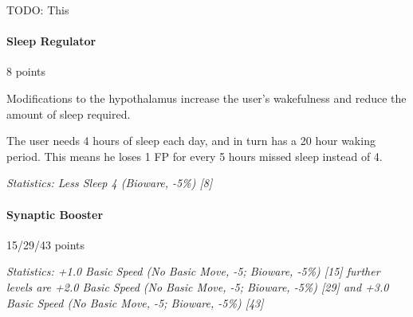 \begin{multicols*}{3}
	TODO: This
	
	\paragraph{Sleep Regulator}
	\begin{flushright}
		8 points
	\end{flushright}
	
	Modifications to the hypothalamus increase the user's wakefulness and reduce the amount of sleep required. 
	
	The user needs 4 hours of sleep each day, and in turn has a 20 hour waking period. This means he loses 1 FP for every 5 hours missed sleep instead of 4.
	
	\textit{\textcolor{OliveGreen}{Statistics: Less Sleep 4 (Bioware, -5\%) [8]}}
	
	\paragraph{Synaptic Booster}
	\begin{flushright}
		15/29/43 points
	\end{flushright}
	
	\textit{\textcolor{OliveGreen}{Statistics: +1.0 Basic Speed (No Basic Move, -5; Bioware, -5\%) [15] further levels are +2.0 Basic Speed (No Basic Move, -5; Bioware, -5\%) [29] and +3.0 Basic Speed (No Basic Move, -5; Bioware, -5\%) [43]}}
	
\end{multicols*}